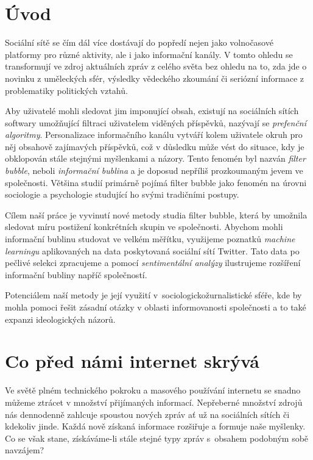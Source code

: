 \documentclass[12pt, a4paper]{article}
\numberwithin{equation}{section} 	%
\begin{document}

\newpage
\section*{Úvod}
\noindent Sociální sítě se čím dál více dostávají do popředí nejen jako volnočasové platformy pro různé aktivity, ale i jako informační kanály. V tomto ohledu se transformují ve zdroj aktuálních zpráv z celého světa bez ohledu na to, zda jde o novinku z uměleckých sfér, výsledky vědeckého zkoumání či seriózní informace z problematiky politických vztahů.

Aby uživatelé mohli sledovat jim imponující obsah, existují na sociálních sítích softwary umožňující filtraci uživatelem viděných příspěvků, nazývají se \textit{prefenční algoritmy}. Personalizace informačního kanálu vytváří kolem uživatele okruh pro něj obsahově zajímavých příspěvků, což v důsledku může vést do situace, kdy je obklopován stále stejnými myšlenkami a názory. Tento fenomén byl nazván \textit{filter bubble}, neboli \textit{informační bublina} a je doposud nepříliš prozkoumaným jevem ve společnosti. Většina studií primárně pojímá filter bubble jako fenomén na úrovni sociologie a psychologie studující ho svými tradičními postupy.

Cílem naší práce je vyvinutí nové metody studia filter bubble, která by umožnila sledovat míru postižení konkrétních skupin ve společnosti. Abychom mohli informační bublinu studovat ve velkém měřítku, využijeme poznatků \textit{machine learningu} aplikovaných na data poskytovaná sociální sítí Twitter. Tato data po pečlivé selekci zpracujeme a pomocí \textit{sentimentální analýzy} ilustrujeme rozšíření informační bubliny napříč společností.

Potenciálem naší metody je její využití v sociologickožurnalistické sféře, kde by mohla pomoci řešit zásadní otázky v oblasti informovanosti společnosti a to také expanzi ideologických názorů.

\newpage
\section{Co před námi internet skrývá}
\noindent  Ve světě plném technického pokroku a masového používání internetu se snadno můžeme ztrácet v množství přijímaných informací. Nepřeberné množství zdrojů nás dennodenně zahlcuje spoustou nových zpráv ať už na sociálních sítích či kdekoliv jinde. Každá nově získaná informace rozšiřuje a formuje naše myšlenky. Co se však stane, získáváme-li stále stejné typy zpráv s obsahem podobným sobě navzájem?
\end{document}
